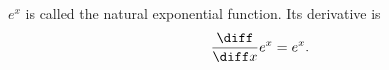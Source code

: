 \begin{frame}
\begin{definition}
$e^x$ is called the natural exponential function.  Its derivative is
\[
\frac{\diff}{\diff x} e^x = e^x .
\]
\end{definition}
\end{frame}
